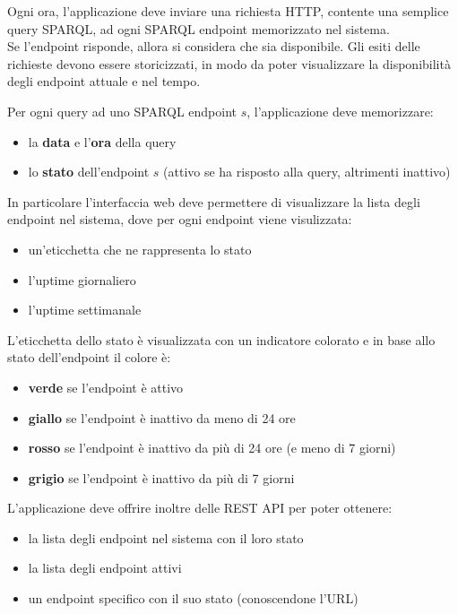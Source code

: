 \documentclass{article}
\begin{document}
Ogni ora, l'applicazione deve inviare una richiesta HTTP, contente
una semplice query SPARQL, ad ogni SPARQL endpoint memorizzato nel sistema.\\
Se l'endpoint risponde, allora si considera che sia disponibile.
Gli esiti delle richieste devono essere storicizzati, in modo da poter visualizzare
la disponibilità degli endpoint attuale e nel tempo.

Per ogni query ad uno SPARQL endpoint $s$, l'applicazione deve memorizzare:
\begin{itemize}
    \item la \textbf{data} e l'\textbf{ora} della query
    \item lo \textbf{stato} dell'endpoint $s$ (attivo se ha risposto alla query, altrimenti inattivo)
\end{itemize}

In particolare l'interfaccia web deve permettere di visualizzare
la lista degli endpoint nel sistema, dove per ogni endpoint viene visulizzata:
\begin{itemize}
    \item un'eticchetta che ne rappresenta lo stato
    \item l'uptime giornaliero
    \item l'uptime settimanale
\end{itemize}

L'eticchetta dello stato è visualizzata con un indicatore colorato e in base allo stato dell'endpoint il colore è:
\begin{itemize}
    \item \textbf{verde} se l'endpoint è attivo
    \item \textbf{giallo} se l'endpoint è inattivo da meno di 24 ore
    \item \textbf{rosso} se l'endpoint è inattivo da più di 24 ore (e meno di 7 giorni)
    \item \textbf{grigio} se l'endpoint è inattivo da più di 7 giorni
\end{itemize}

L'applicazione deve offrire inoltre delle REST API per poter ottenere:
\begin{itemize}
    \item la lista degli endpoint nel sistema con il loro stato
    \item la lista degli endpoint attivi
    \item un endpoint specifico con il suo stato (conoscendone l'URL)
\end{itemize}
\end{document}
